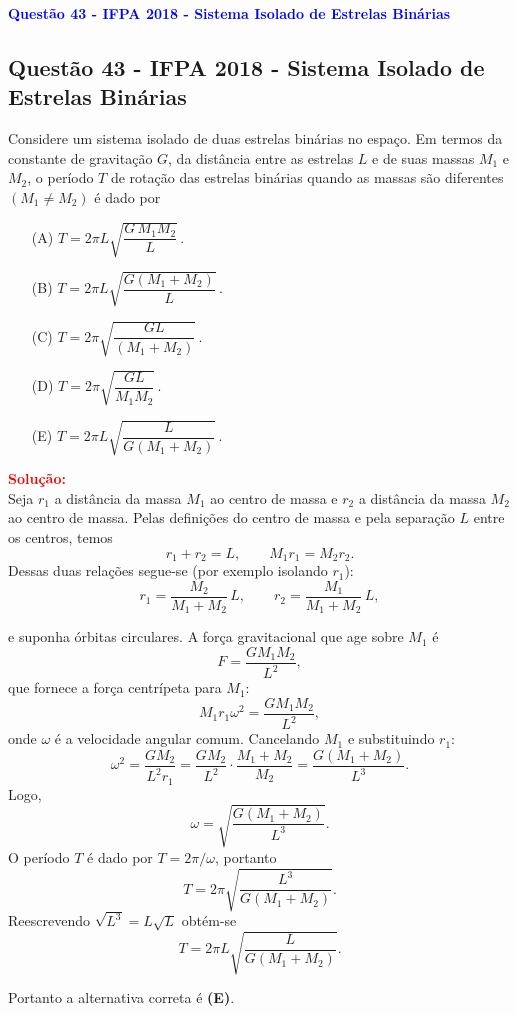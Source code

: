 \begin{flushleft}
\textbf{\textcolor{blue}{\Large Quest\~ao 43 - IFPA 2018 - Sistema Isolado de Estrelas Binárias}}\\
\noindent

\subsection{Quest\~ao 43 - IFPA 2018 - Sistema Isolado de Estrelas Binárias}

Considere um sistema isolado de duas estrelas binárias no espaço. Em termos da constante de gravitação $G$, da distância entre 
as estrelas $L$ e de suas massas $M_1$ e $M_2$, o período $T$ de rotação das estrelas binárias quando as massas são diferentes 
$(M_1\neq M_2)$ é dado por

\begin{itemize}
\item[(A)] $T=2\pi L\sqrt{\dfrac{G\,M_1M_2}{L}}\,$.
\item[(B)] $T=2\pi L\sqrt{\dfrac{G(M_1+M_2)}{L}}\,$.
\item[(C)] $T=2\pi\sqrt{\dfrac{G L}{(M_1+M_2)}}\,$.
\item[(D)] $T=2\pi\sqrt{\dfrac{G L}{M_1M_2}}\,$.
\item[(E)] $T=2\pi L\sqrt{\dfrac{L}{G(M_1+M_2)}}\,$.
\end{itemize}

\vspace{0.5cm}

\textcolor{red}{\textbf{Solu\c{c}\~ao:}}\\

Seja $r_1$ a distância da massa $M_1$ ao centro de massa e $r_2$ a distância da massa $M_2$ ao centro de massa. 
Pelas defini\c{c}\~oes do centro de massa e pela separa\c{c}\~ao $L$ entre os centros, temos
\[
r_1 + r_2 = L,
\qquad
M_1 r_1 = M_2 r_2.
\]
Dessas duas rela\c{c}\~oes segue-se (por exemplo isolando $r_1$):
\[
r_1=\frac{M_2}{M_1+M_2}\,L,
\qquad
r_2=\frac{M_1}{M_1+M_2}\,L,
\]


e suponha órbitas circulares. A força gravitacional que age sobre $M_1$ é
\[
F=\frac{G M_1 M_2}{L^2},
\]
que fornece a força centrípeta para $M_1$:
\[
M_1 r_1 \omega^2=\frac{G M_1 M_2}{L^2},
\]
onde $\omega$ é a velocidade angular comum. Cancelando $M_1$ e substituindo $r_1$:
\[
\omega^2=\frac{G M_2}{L^2 r_1}
=\frac{G M_2}{L^2}\cdot\frac{M_1+M_2}{M_2}
=\frac{G(M_1+M_2)}{L^3}.
\]
Logo,
\[
\omega=\sqrt{\frac{G(M_1+M_2)}{L^3}}.
\]
O período $T$ é dado por $T=2\pi/\omega$, portanto
\[
T=2\pi\sqrt{\frac{L^3}{G(M_1+M_2)}}.
\]
Reescrevendo $\sqrt{L^3}=L\sqrt{L}$ obtém-se
\[
T=2\pi L\sqrt{\frac{L}{G(M_1+M_2)}}.
\]

Portanto a alternativa correta é \colorbox{green!50}{\textbf{(E)}}.

\end{flushleft}


